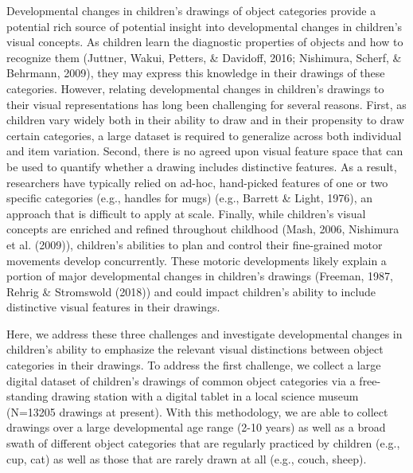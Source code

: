 \documentclass[10pt, letterpaper]{article}
\begin{document}
Developmental changes in children's drawings of object categories
provide a potential rich source of potential insight into developmental
changes in children's visual concepts. As children learn the diagnostic
properties of objects and how to recognize them (Juttner, Wakui,
Petters, \& Davidoff, 2016; Nishimura, Scherf, \& Behrmann, 2009), they
may express this knowledge in their drawings of these categories.
However, relating developmental changes in children's drawings to their
visual representations has long been challenging for several reasons.
First, as children vary widely both in their ability to draw and in
their propensity to draw certain categories, a large dataset is required
to generalize across both individual and item variation. Second, there
is no agreed upon visual feature space that can be used to quantify
whether a drawing includes distinctive features. As a result,
researchers have typically relied on ad-hoc, hand-picked features of one
or two specific categories (e.g., handles for mugs) (e.g., Barrett \&
Light, 1976), an approach that is difficult to apply at scale. Finally,
while children's visual concepts are enriched and refined throughout
childhood (Mash, 2006, Nishimura et al. (2009)), children's abilities to
plan and control their fine-grained motor movements develop
concurrently. These motoric developments likely explain a portion of
major developmental changes in children's drawings (Freeman, 1987,
Rehrig \& Stromswold (2018)) and could impact children's ability to
include distinctive visual features in their drawings.

Here, we address these three challenges and investigate developmental
changes in children's ability to emphasize the relevant visual
distinctions between object categories in their drawings. To address the
first challenge, we collect a large digital dataset of children's
drawings of common object categories via a free-standing drawing station
with a digital tablet in a local science museum (N=13205 drawings at
present). With this methodology, we are able to collect drawings over a
large developmental age range (2-10 years) as well as a broad swath of
different object categories that are regularly practiced by children
(e.g., cup, cat) as well as those that are rarely drawn at all (e.g.,
couch, sheep).
\end{document}
